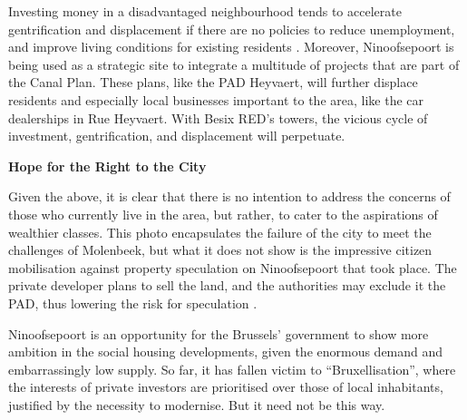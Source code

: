 \documentclass{article}[11pt]
\begin{document}
Investing money in a disadvantaged neighbourhood tends to accelerate gentrification and displacement if there are no policies to reduce unemployment, and improve living conditions for existing residents \parencite{required}.
Moreover, Ninoofsepoort is being used as a strategic site to integrate a multitude of projects that are part of the Canal Plan. These plans, like the PAD Heyvaert, will further displace residents and especially local businesses important to the area, like the car dealerships in Rue Heyvaert.
With Besix RED's towers, the vicious cycle of investment, gentrification, and displacement will perpetuate.


\textbf{Hope for the Right to the City}

Given the above, it is clear that there is no intention to address the concerns of those who currently live in the area, but rather, to cater to the aspirations of wealthier classes. 
This photo encapsulates the failure of the city to meet the challenges of Molenbeek, but what it does not show is the impressive citizen mobilisation against property speculation on Ninoofsepoort that took place. The private developer plans to sell the land, and the authorities may exclude it the PAD, thus lowering the risk for speculation \parencite{ieb2020ninove}.

Ninoofsepoort is an opportunity for the Brussels' government to show more ambition in the social housing developments, given the enormous demand and embarrassingly low supply. So far, it has fallen victim to ``Bruxellisation'', where the interests of private investors are prioritised over those of local inhabitants, justified by the necessity to modernise. But it need not be this way.

\pagebreak

\printbibliography 
\end{document}
